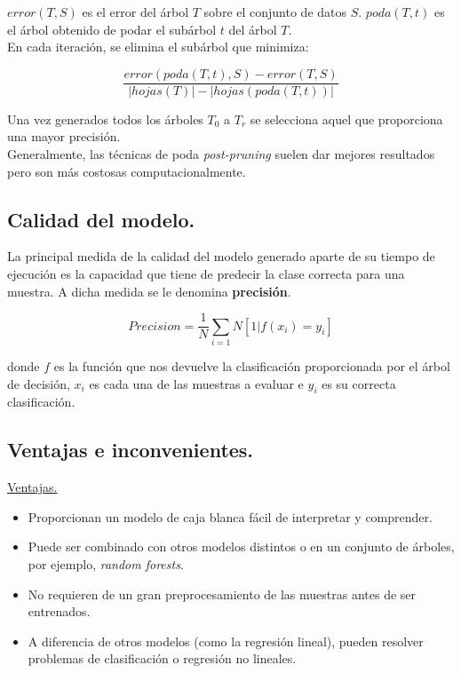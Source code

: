 $error(T, S)$ es el error del árbol $T$ sobre el conjunto de datos $S$. $poda(T, t)$ es el árbol obtenido de podar el subárbol $t$ del árbol $T$.\\

En cada iteración, se elimina el subárbol que minimiza:

$$
\frac{error(poda(T, t), S) - error(T, S)}{|hojas(T)| - |hojas(poda(T, t))|}
$$

Una vez generados todos los árboles $T_0$ a $T_r$ se selecciona aquel que proporciona una mayor precisión.\\

Generalmente, las técnicas de poda \textit{post-pruning} suelen dar mejores resultados pero son más costosas computacionalmente.
\subsection{Calidad del modelo.}
La principal medida de la calidad del modelo generado aparte de su tiempo de ejecución es la capacidad que tiene de predecir la clase correcta para una muestra. A dicha medida se le denomina \textbf{precisión}.

$$
Precision = \frac{1}{N}\sum_{i=1}{N}[1|f(x_i) = y_i]
$$

donde $f$ es la función que nos devuelve la clasificación proporcionada por el árbol de decisión, $x_i$ es cada una de las muestras a evaluar e $y_i$ es su correcta clasificación.

\subsection{Ventajas e inconvenientes.}
\underline{Ventajas.}\\
\begin{itemize}
	\item Proporcionan un modelo de caja blanca fácil de interpretar y comprender.
	\item Puede ser combinado con otros modelos distintos o en un conjunto de árboles, por ejemplo, \textit{random forests}.
	\item No requieren de un gran preprocesamiento de las muestras antes de ser entrenados.
	\item A diferencia de otros modelos (como la regresión lineal), pueden resolver problemas de clasificación o regresión no lineales.\\
\end{itemize}

